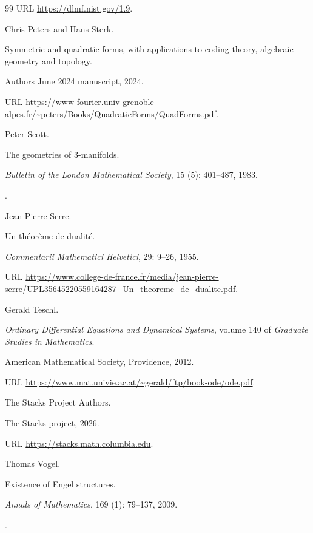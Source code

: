 \documentclass[11pt,a4paper]{article}
\numberwithin{equation}{section}
\theoremstyle{definition}
\begin{document}
\begin{thebibliography}{99}
\newblock URL \url{https://dlmf.nist.gov/1.9}.

Chris Peters and Hans Sterk.

\newblock Symmetric and quadratic forms, with applications to coding theory,
  algebraic geometry and topology.

\newblock Authors\textquotesingle{} June 2024 manuscript, 2024.

\newblock URL
  \url{https://www-fourier.univ-grenoble-alpes.fr/~peters/Books/QuadraticForms/QuadForms.pdf}.

Peter Scott.

\newblock The geometries of 3-manifolds.

\newblock \emph{Bulletin of the London Mathematical Society}, 15
  (5): 401--487, 1983.

\newblock {}.

Jean-Pierre Serre.

\newblock Un th{\'e}or{\`e}me de dualit{\'e}.

\newblock \emph{Commentarii Mathematici Helvetici}, 29: 9--26, 1955.

\newblock URL
  \url{https://www.college-de-france.fr/media/jean-pierre-serre/UPL35645220559164287_Un_theoreme_de_dualite.pdf}.

Gerald Teschl.

\newblock \emph{Ordinary Differential Equations and Dynamical Systems}, volume
  140 of \emph{Graduate Studies in Mathematics}.

\newblock American Mathematical Society, Providence, 2012.

\newblock URL \url{https://www.mat.univie.ac.at/~gerald/ftp/book-ode/ode.pdf}.

{The Stacks Project Authors}.

\newblock The Stacks project, 2026.

\newblock URL \url{https://stacks.math.columbia.edu}.

Thomas Vogel.

\newblock Existence of Engel structures.

\newblock \emph{Annals of Mathematics}, 169 (1): 79--137,
  2009.

\newblock {}.


\end{thebibliography}
\end{document}
